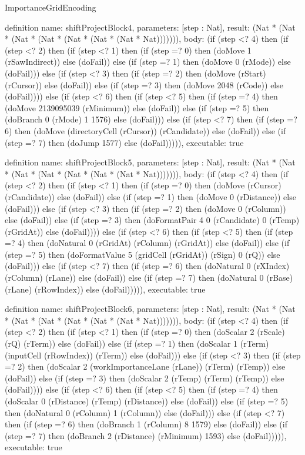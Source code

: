 \begin{lexlean}{ImportanceGridEncoding}
\begin{semanticmodule}
definition{
  name: shiftProjectBlock4,
  parameters: [step : Nat],
  result: (Nat * (Nat * (Nat * (Nat * (Nat * (Nat * (Nat * Nat))))))),
  body: (if (step <? 4) then
      (if (step <? 2) then
      (if (step <? 1) then
      (if (step =? 0) then (doMove 1 (rSawIndirect)) else (doFail)) else
      (if (step =? 1) then (doMove 0 (rMode)) else (doFail))) else
      (if (step <? 3) then
      (if (step =? 2) then (doMove (rStart) (rCursor)) else (doFail)) else
      (if (step =? 3) then (doMove 2048 (rCode)) else (doFail)))) else
      (if (step <? 6) then
      (if (step <? 5) then
      (if (step =? 4) then (doMove 2139095039 (rMinimum)) else (doFail)) else
      (if (step =? 5) then (doBranch 0 (rMode) 1 1576) else (doFail))) else
      (if (step <? 7) then
      (if (step =? 6) then (doMove (directoryCell (rCursor)) (rCandidate)) else (doFail)) else
      (if (step =? 7) then (doJump 1577) else (doFail))))),
  executable: true
}

definition{
  name: shiftProjectBlock5,
  parameters: [step : Nat],
  result: (Nat * (Nat * (Nat * (Nat * (Nat * (Nat * (Nat * Nat))))))),
  body: (if (step <? 4) then
      (if (step <? 2) then
      (if (step <? 1) then
      (if (step =? 0) then (doMove (rCursor) (rCandidate)) else (doFail)) else
      (if (step =? 1) then (doMove 0 (rDistance)) else (doFail))) else
      (if (step <? 3) then
      (if (step =? 2) then (doMove 0 (rColumn)) else (doFail)) else
      (if (step =? 3) then (doFormatPair 4 0 (rCandidate) 0 (rTemp) (rGridAt)) else (doFail)))) else
      (if (step <? 6) then
      (if (step <? 5) then
      (if (step =? 4) then (doNatural 0 (rGridAt) (rColumn) (rGridAt)) else (doFail)) else
      (if (step =? 5) then (doFormatValue 5 (gridCell (rGridAt)) (rSign) 0 (rQ)) else (doFail))) else
      (if (step <? 7) then
      (if (step =? 6) then (doNatural 0 (rXIndex) (rColumn) (rLane)) else (doFail)) else
      (if (step =? 7) then (doNatural 0 (rBase) (rLane) (rRowIndex)) else (doFail))))),
  executable: true
}

definition{
  name: shiftProjectBlock6,
  parameters: [step : Nat],
  result: (Nat * (Nat * (Nat * (Nat * (Nat * (Nat * (Nat * Nat))))))),
  body: (if (step <? 4) then
      (if (step <? 2) then
      (if (step <? 1) then
      (if (step =? 0) then (doScalar 2 (rScale) (rQ) (rTerm)) else (doFail)) else
      (if (step =? 1) then (doScalar 1 (rTerm) (inputCell (rRowIndex)) (rTerm)) else (doFail))) else
      (if (step <? 3) then
      (if (step =? 2) then (doScalar 2 (workImportanceLane (rLane)) (rTerm) (rTemp)) else (doFail)) else
      (if (step =? 3) then (doScalar 2 (rTemp) (rTerm) (rTemp)) else (doFail)))) else
      (if (step <? 6) then
      (if (step <? 5) then
      (if (step =? 4) then (doScalar 0 (rDistance) (rTemp) (rDistance)) else (doFail)) else
      (if (step =? 5) then (doNatural 0 (rColumn) 1 (rColumn)) else (doFail))) else
      (if (step <? 7) then
      (if (step =? 6) then (doBranch 1 (rColumn) 8 1579) else (doFail)) else
      (if (step =? 7) then (doBranch 2 (rDistance) (rMinimum) 1593) else (doFail))))),
  executable: true
}


\end{semanticmodule}
\end{lexlean}

